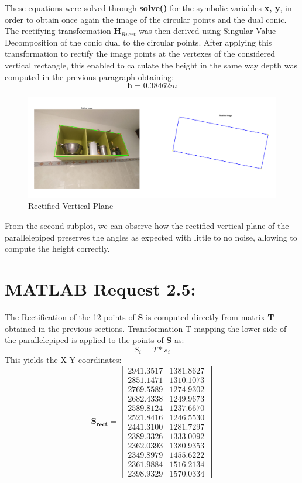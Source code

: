 \documentclass{Configuration_Files/PoliMi3i_thesis}
\begin{document}
These equations were solved through \textbf{solve()} for the symbolic variables \textbf{x, y}, in order to obtain once again the image of the circular points and the dual conic.
The rectifying transformation $\mathbf{H}_{Rvert}$ was then derived using Singular Value Decomposition of the conic dual to the circular points. After applying this transformation to rectify the image points at the vertexes of the considered vertical rectangle, this enabled to calculate the height in the same way depth was computed in the previous paragraph obtaining:
\[
\mathbf{h} = 0.38462 m
\]
\begin{figure}[H]
    \centering
    \includegraphics[width=0.9\linewidth]{Project Template/Images/point4.png}
    \caption{Rectified Vertical Plane}
    \label{fig:enter-label}
\end{figure}

From the second subplot, we can observe how the rectified vertical plane of the parallelepiped preserves the angles as expected with little to no noise, allowing to compute the height correctly.


\newpage
\section{MATLAB Request 2.5: }
The Rectification of the 12 points of \textbf{S} is computed directly from matrix \textbf{T} obtained in the previous sections.
Transformation T mapping the lower side of the parallelepiped is applied to the points of \textbf{S} as:
\[
S_{i} = T * s_{i}
\]
This yields the X-Y coordinates:
\[
\mathbf{S_{rect}} = \begin{bmatrix}
2941.3517 & 1381.8627 \\
2851.1471 & 1310.1073 \\
2769.5589 & 1274.9302 \\
2682.4338 & 1249.9673 \\
2589.8124 & 1237.6670 \\
2521.8416 & 1246.5530 \\
2441.3100 & 1281.7297 \\
2389.3326 & 1333.0092 \\
2362.0393 & 1380.9353 \\
2349.8979 & 1455.6222 \\
2361.9884 & 1516.2134 \\
2398.9329 & 1570.0334
\end{bmatrix}
\]
\end{document}
